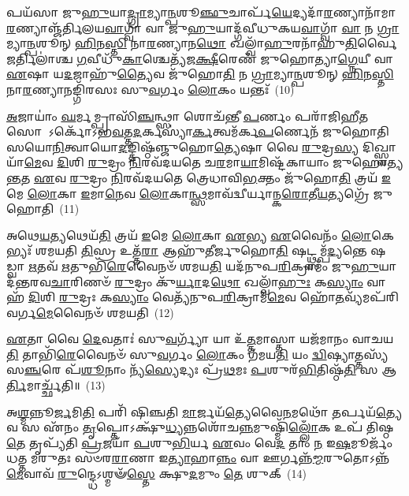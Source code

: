 𑌪𑌯᳴𑌸𑌾 𑌜𑍁\-\ul{𑌹𑍁}\-𑌯𑌾\-\ul{𑌦𑍍𑌗𑍍𑌰𑌾}\-𑌮𑍍𑌯𑌾\-\ul{𑌨𑍍𑌪}\-𑌶𑍂\-\ul{𑌞𑍍𑌛𑍁}\-𑌚𑌾𑌰𑍍𑌪᳴\-\ul{𑌯𑍇}\-𑌦𑍍𑌯𑌦𑌾᳴\-\ul{𑌰}\-𑌣𑍍𑌯𑌾𑌨𑌾᳴𑌮𑌾\-\ul{𑌰}\-𑌣𑍍𑌯𑌾𑌞𑍍𑌜᳴𑌰𑍍𑌤𑌿𑌲𑌯\-\ul{𑌵𑌾}\-𑌗𑍍𑌵𑌾᳴ 𑌵𑌾 𑌜𑍁\-\ul{𑌹𑍁}\-𑌯𑌾𑌦𑍍𑌗᳴𑌵𑍀𑌧𑍁𑌕𑌯\-\ul{𑌵𑌾}\-𑌗𑍍𑌵𑌾᳴ \ul{𑌵𑌾} 𑌨 \ul{𑌗𑍍𑌰𑌾}\-𑌮𑍍𑌯𑌾\-\ul{𑌨𑍍𑌪}\-𑌶𑍂𑌨𑍍 \ul{𑌹𑌿}\-𑌨\-\ul{𑌸𑍍𑌤𑌿} 𑌨𑌾\-\ul{𑌰}\-𑌣𑍍𑌯𑌾𑌨\-\ul{𑌥𑍋} 𑌖𑌲𑍍𑌵𑌾᳴\-\ul{𑌹𑍁}\-𑌰𑌨𑌾᳴𑌹𑍁\-\ul{𑌤𑌿}\-𑌰𑍍𑌵𑍈 \ul{𑌜}\-𑌰𑍍𑌤𑌿𑌲𑌾॑𑌶𑍍𑌚 \ul{𑌗}\-𑌵𑍀𑌧𑍁᳴\-\ul{𑌕𑌾}\-𑌶𑍍𑌚𑍇𑌤𑍍𑌯᳴𑌜\-\ul{𑌕𑍍𑌷𑍀}\-𑌰𑍇𑌣᳴ 𑌜𑍁𑌹𑍋𑌤𑍍𑌯𑌾\-\ul{𑌗𑍍𑌨𑍇}\-𑌯𑍀 𑌵𑌾 \ul{𑌏}\-𑌷𑌾 𑌯\-\ul{𑌦}\-𑌜𑌾𑌹𑍁᳴\-\ul{𑌤𑍍𑌯𑍈}\-𑌵 𑌜𑍁᳴𑌹𑍋\-\ul{𑌤𑌿} 𑌨 \ul{𑌗𑍍𑌰𑌾}\-𑌮𑍍𑌯𑌾\-\ul{𑌨𑍍𑌪}\-𑌶𑍂𑌨𑍍 \ul{𑌹𑌿}\-𑌨\-\ul{𑌸𑍍𑌤𑌿} 𑌨𑌾\-\ul{𑌰}\-𑌣𑍍𑌯𑌾𑌨𑌙𑍍𑌗𑌿᳴𑌰𑌸𑌃 𑌸𑍁\-\ul{𑌵}\-𑌰𑍍𑌗𑌂 \ul{𑌲𑍋}\-𑌕𑌂 𑌯𑌨𑍍𑌤𑌃᳴~(10)

\-\ul{𑌅}\-𑌜𑌾𑌯𑌾𑌂॑ \ul{𑌘}\-𑌰𑍍𑌮𑌮𑍍𑌪𑍍𑌰𑌾𑌸𑌿᳴\-\ul{𑌞𑍍𑌚}\-𑌨𑍍𑌥𑍍𑌸𑌾 𑌶𑍋𑌚᳴𑌨𑍍𑌤𑍀 \ul{𑌪}\-𑌰𑍍𑌣𑌂 𑌪𑌰𑌾᳴𑌜𑌿𑌹𑍀\-\ul{𑌤} 𑌸𑍋 \-𑌽𑌰𑍍𑌕𑍋᳴\-𑌽𑌭\-\ul{𑌵}\-𑌤𑍍𑌤\-\ul{𑌦}\-𑌰𑍍𑌕𑌸𑍍𑌯𑌾॑\-\ul{𑌰𑍍𑌕}\-𑌤𑍍𑌵𑌮᳴𑌰𑍍𑌕\-\ul{𑌪}\-𑌰𑍍𑌣𑍇𑌨᳴ 𑌜𑍁𑌹𑍋𑌤𑌿 𑌸𑌯𑍋\-\ul{𑌨𑌿}\-𑌤𑍍𑌵𑌾𑌯𑍋\-\ul{𑌦}\-𑌙𑍍𑌤𑌿𑌷𑍍𑌠᳴𑌞𑍍𑌜𑍁𑌹𑍋\-\ul{𑌤𑍍𑌯𑍇}\-𑌷𑌾 𑌵𑍈 \ul{𑌰𑍁}\-𑌦𑍍𑌰\-\ul{𑌸𑍍𑌯} 𑌦𑌿𑌖𑍍𑌸𑍍𑌵𑌾𑌯𑌾᳴\-\ul{𑌮𑍇}\-𑌵 \ul{𑌦𑌿}\-𑌶𑌿 \ul{𑌰𑍁}\-𑌦𑍍𑌰𑌂 \ul{𑌨𑌿}\-𑌰𑌵᳴𑌦𑌯𑌤𑍇 𑌚\-\ul{𑌰}\-𑌮𑌾\-\ul{𑌯𑌾}\-𑌮𑌿𑌷𑍍𑌟᳴𑌕𑌾𑌯𑌾𑌂 𑌜𑍁𑌹𑍋𑌤𑍍𑌯\-\ul{𑌨𑍍𑌤}\-𑌤 \ul{𑌏}\-𑌵 \ul{𑌰𑍁}\-𑌦𑍍𑌰𑌂 \ul{𑌨𑌿}\-𑌰𑌵᳴𑌦𑌯𑌤𑍇 𑌤𑍍𑌰𑍇𑌧𑌾𑌵𑌿\-\ul{𑌭}\-𑌕𑍍𑌤𑌂 𑌜𑍁᳴𑌹𑍋\-\ul{𑌤𑌿} 𑌤𑍍𑌰𑌯᳴ \ul{𑌇}\-𑌮𑍇 \ul{𑌲𑍋}\-𑌕𑌾 \ul{𑌇}\-𑌮𑌾\-\ul{𑌨𑍇}\-𑌵 \ul{𑌲𑍋}\-𑌕𑌾\-\ul{𑌨𑍍𑌥𑍍𑌸}\-𑌮𑌾𑌵᳴𑌦𑍍𑌵𑍀𑌰𑍍𑌯𑌾𑌨𑍍𑌕\-\ul{𑌰𑍋}\-𑌤𑍀\-\ul{𑌯}\-𑌤𑍍𑌯𑌗𑍍𑌰𑍇᳴ 𑌜𑍁𑌹𑍋𑌤𑌿~(11)

𑌅𑌥𑍇\-\ul{𑌯}\-𑌤𑍍𑌯𑌥𑍇𑌯᳴\-\ul{𑌤𑌿} 𑌤𑍍𑌰𑌯᳴ \ul{𑌇}\-𑌮𑍇 \ul{𑌲𑍋}\-𑌕𑌾 \ul{𑌏}\-𑌭𑍍𑌯 \ul{𑌏}\-𑌵𑍈𑌨𑌂᳴ \ul{𑌲𑍋}\-𑌕𑍇𑌭𑍍𑌯𑌃᳴ 𑌶𑌮𑌯𑌤𑌿 \ul{𑌤𑌿}\-𑌸𑍍𑌰 𑌉𑌤𑍍𑌤᳴\-\ul{𑌰𑌾} 𑌆𑌹𑍁᳴𑌤𑍀𑌰𑍍𑌜𑍁𑌹𑍋\-\ul{𑌤𑌿} 𑌷𑌟𑍍𑌥𑍍𑌸𑌮𑍍𑌪᳴\-\ul{𑌦𑍍𑌯}\-𑌨𑍍𑌤𑍇 𑌷𑌡𑍍𑌵𑌾 \ul{𑌋}\-𑌤𑌵᳴ \ul{𑌋}\-𑌤𑍁𑌭𑌿᳴\-\ul{𑌰𑍇}\-𑌵𑍈𑌨𑍞᳴ 𑌶𑌮𑌯\-\ul{𑌤𑌿} 𑌯𑌦᳴𑌨𑍁𑌪\-\ul{𑌰𑌿}\-𑌕𑍍𑌰𑌾𑌮𑌂᳴ 𑌜𑍁\-\ul{𑌹𑍁}\-𑌯𑌾𑌦᳴𑌨𑍍𑌤𑌰𑌵\-\ul{𑌚𑌾}\-𑌰𑌿𑌣𑍞᳴ \ul{𑌰𑍁}\-𑌦𑍍𑌰𑌂 𑌕𑍁᳴\-\ul{𑌰𑍍𑌯𑌾}\-𑌦\-\ul{𑌥𑍋} 𑌖𑌲𑍍𑌵𑌾᳴\-\ul{𑌹𑍁𑌃} 𑌕\-\ul{𑌸𑍍𑌯𑌾𑌂} 𑌵𑌾𑌹᳴ \ul{𑌦𑌿}\-𑌶𑌿 \ul{𑌰𑍁}\-𑌦𑍍𑌰𑌃 𑌕\-\ul{𑌸𑍍𑌯𑌾𑌂} 𑌵𑍇𑌤𑍍𑌯᳴𑌨𑍁𑌪\-\ul{𑌰𑌿}\-𑌕𑍍𑌰𑌾𑌮᳴\-\ul{𑌮𑍇}\-𑌵 𑌹𑍋᳴\-\ul{𑌤}\-𑌵𑍍𑌯᳴𑌮𑌪᳴𑌰𑌿𑌵𑌰𑍍𑌗\-\ul{𑌮𑍇}\-𑌵𑍈𑌨𑍞᳴ 𑌶𑌮𑌯𑌤𑌿~(12)

\-\ul{𑌏}\-𑌤𑌾 𑌵𑍈 \ul{𑌦𑍇}\-𑌵𑌤𑌾𑌃॑ 𑌸𑍁\-\ul{𑌵}\-𑌰𑍍𑌗𑍍𑌯𑌾᳴ 𑌯𑌾 𑌉᳴\-\ul{𑌤𑍍𑌤}\-𑌮𑌾𑌸𑍍𑌤𑌾 𑌯𑌜᳴𑌮𑌾𑌨𑌂 𑌵𑌾𑌚𑌯\-\ul{𑌤𑌿} 𑌤𑌾𑌭𑌿᳴\-\ul{𑌰𑍇}\-𑌵𑍈𑌨𑍞᳴ 𑌸𑍁\-\ul{𑌵}\-𑌰𑍍𑌗𑌂 \ul{𑌲𑍋}\-𑌕𑌂 𑌗᳴𑌮𑌯\-\ul{𑌤𑌿} 𑌯𑌂 \ul{𑌦𑍍𑌵𑌿}\-𑌷𑍍𑌯𑌾𑌤𑍍𑌤𑌸𑍍𑌯᳴ 𑌸\-\ul{𑌞𑍍𑌚}\-𑌰𑍇 𑌪᳴\-\ul{𑌶𑍂}\-𑌨𑌾𑌂 𑌨𑍍𑌯᳴\-\ul{𑌸𑍍𑌯𑍇}\-𑌦𑍍𑌯𑌃 𑌪𑍍𑌰᳴\-\ul{𑌥}\-𑌮𑌃 \ul{𑌪}\-𑌶𑍁𑌰᳴\-\ul{𑌭𑌿}\-𑌤𑌿𑌷𑍍𑌠᳴\-\ul{𑌤𑌿} 𑌸 𑌆\-\ul{𑌰𑍍𑌤𑌿}\-𑌮𑌾𑌰𑍍𑌚𑍍𑌛᳴𑌤𑌿॥~(13)

{\anuvakamend[{\-\ul{𑌪}\-\-\ul{𑌶𑍂}\-𑌨𑌾𑌂 𑌯𑌨𑍍𑌤𑍋\-𑌽𑌗𑍍𑌰𑍇᳴ 𑌜𑍁\-\ul{𑌹𑍋}\-𑌤𑍍𑌯𑌪᳴𑌰𑌿𑌵𑌰𑍍𑌗\-\ul{𑌮𑍇}\-𑌵𑍈𑌨𑍞᳴ 𑌶𑌮𑌯𑌤𑌿 \ul{𑌤𑍍𑌰𑌿}\-\-\ul{𑍞}\-𑌶𑌚𑍍𑌚᳴}]}%

𑌅\-\ul{𑌶𑍍𑌮}\-𑌨𑍍𑌨𑍂\-\ul{𑌰𑍍𑌜}\-𑌮𑌿\-\ul{𑌤𑌿} 𑌪𑌰𑌿᳴ 𑌷𑌿𑌞𑍍𑌚𑌤𑌿 \ul{𑌮𑌾}\-𑌰𑍍𑌜𑌯᳴\-\ul{𑌤𑍍𑌯𑍇}\-𑌵𑍈\-\ul{𑌨}\-𑌮𑌥𑍋᳴ \ul{𑌤}\-𑌰𑍍𑌪𑌯᳴\-\ul{𑌤𑍍𑌯𑍇}\-𑌵 𑌸 𑌏᳴𑌨𑌂 \ul{𑌤𑍃}\-𑌪𑍍𑌤𑍋\-𑌽𑌕𑍍𑌷𑍁᳴\-\ul{𑌧𑍍𑌯}\-𑌨𑍍𑌨𑌶𑍋᳴𑌚\-\ul{𑌨𑍍𑌨}\-𑌮𑍁𑌷𑍍𑌮𑌿᳴\-\ul{𑌲𑍍𑌲𑍋𑌁}\-𑌕 𑌉𑌪᳴ 𑌤𑌿𑌷𑍍𑌠\-\ul{𑌤𑍇} 𑌤𑍃𑌪𑍍𑌯᳴𑌤𑌿 \ul{𑌪𑍍𑌰}\-𑌜𑌯𑌾᳴ \ul{𑌪}\-𑌶𑍁\-\ul{𑌭𑌿}\-𑌰𑍍𑌯 \ul{𑌏}\-𑌵𑌂 𑌵𑍇\-\ul{𑌦} 𑌤𑌾𑌂 \ul{𑌨} 𑌇\-\ul{𑌷}\-𑌮𑍂𑌰𑍍𑌜𑌂᳴ 𑌧𑌤𑍍𑌤 𑌮𑌰𑍁𑌤𑌃 𑌸𑍞𑌰\-\ul{𑌰𑌾}\-𑌣𑌾 𑌇\-\ul{𑌤𑍍𑌯𑌾}\-𑌹𑌾\-\ul{𑌨𑍍𑌨𑌂} 𑌵𑌾 𑌊𑌰𑍍𑌗𑌨𑍍𑌨᳴\-\ul{𑌮𑍍𑌮}\-𑌰𑍁𑌤𑍋\-𑌽𑌨𑍍𑌨᳴\-\ul{𑌮𑍇}\-𑌵𑌾𑌵᳴ \ul{𑌰𑍁}\-𑌨𑍍𑌦𑍍𑌧𑍇\-𑌽𑌶𑍍𑌮𑍟᳴\-\ul{𑌸𑍍𑌤𑍇} 𑌕𑍍𑌷𑍁\-\ul{𑌦}\-𑌮𑍁𑌂 \ul{𑌤𑍇} 𑌶𑍁𑌕𑍍~(14)

